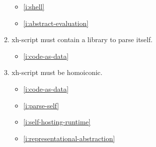 \documentclass{report}
\makeatletter
\newcommand*{\Label}[2]{%
  \@bsphack
  \begingroup
    \label{#1-original}%
    \def\@currentlabel{#2 [\ref{#1-original}]}%
    \label{#1}%
  \endgroup
  \@esphack
}
\makeatother
\begin{document}
\begin{enumerate}
\begin{itemize}
\item \ref{i:shell}
\item \ref{i:abstract-evaluation}
\end{itemize}
\item{}\Label{i:parse-self}{selfparse}
  xh-script must contain a library to parse itself.
\begin{itemize}
\item \ref{i:code-as-data}
\end{itemize}
\item{}\Label{i:homoiconic}{homoiconic}
  xh-script must be homoiconic.
\begin{itemize}
\item \ref{i:code-as-data}
\item \ref{i:parse-self}
\item \ref{i:self-hosting-runtime}
\item \ref{i:representational-abstraction}
\end{itemize}


\end{enumerate}
\end{document}
